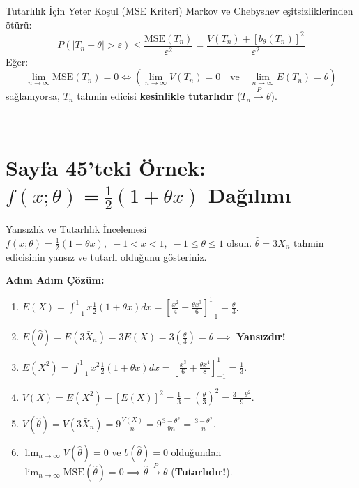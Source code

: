 \documentclass[11pt,a4paper]{article}
\begin{document}
\begin{teorem}{Tutarlılık İçin Yeter Koşul (MSE Kriteri)}
Markov ve Chebyshev eşitsizliklerinden ötürü:
\[
P(|T_n - \theta| > \varepsilon) \le \frac{\text{MSE}(T_n)}{\varepsilon^2} = \frac{V(T_n) + [b_\theta(T_n)]^2}{\varepsilon^2}
\]
Eğer:
\[
\lim_{n\to\infty} \text{MSE}(T_n) = 0 \iff \left( \lim_{n\to\infty} V(T_n) = 0 \quad \text{ve} \quad \lim_{n\to\infty} E(T_n) = \theta \right)
\]
sağlanıyorsa, $T_n$ tahmin edicisi \textbf{kesinlikle tutarlıdır} ($T_n \xrightarrow{P} \theta$).
\end{teorem}

---

\section{Sayfa 45'teki Örnek: \texorpdfstring{$f(x;\theta) = \frac{1}{2}(1 + \theta x)$}{f(x;theta) = 1/2(1 + theta x)} Dağılımı}

\begin{ornek}{Yansızlık ve Tutarlılık İncelemesi}
$f(x;\theta) = \frac{1}{2}(1 + \theta x), \; -1 < x < 1, \; -1 \le \theta \le 1$ olsun. $\hat{\theta} = 3\bar{X}_n$ tahmin edicisinin yansız ve tutarlı olduğunu gösteriniz.

\bigskip
\textbf{Adım Adım Çözüm:}
\begin{enumerate}
    \item $E(X) = \int_{-1}^1 x \frac{1}{2}(1+\theta x) dx = \left[ \frac{x^2}{4} + \frac{\theta x^3}{6} \right]_{-1}^1 = \frac{\theta}{3}$.
    \item $E(\hat{\theta}) = E(3\bar{X}_n) = 3 E(X) = 3 \left(\frac{\theta}{3}\right) = \theta \implies$ \textbf{Yansızdır!}
    \item $E(X^2) = \int_{-1}^1 x^2 \frac{1}{2}(1+\theta x) dx = \left[ \frac{x^3}{6} + \frac{\theta x^4}{8} \right]_{-1}^1 = \frac{1}{3}$.
    \item $V(X) = E(X^2) - [E(X)]^2 = \frac{1}{3} - \left(\frac{\theta}{3}\right)^2 = \frac{3-\theta^2}{9}$.
    \item $V(\hat{\theta}) = V(3\bar{X}_n) = 9 \frac{V(X)}{n} = 9 \frac{3-\theta^2}{9n} = \frac{3-\theta^2}{n}$.
    \item $\lim_{n \to \infty} V(\hat{\theta}) = 0$ ve $b(\hat{\theta})=0$ olduğundan $\lim_{n \to \infty} \text{MSE}(\hat{\theta}) = 0 \implies \boxed{\hat{\theta} \xrightarrow{P} \theta}$ (\textbf{Tutarlıdır!}).
\end{enumerate}
\end{ornek}
\end{document}
